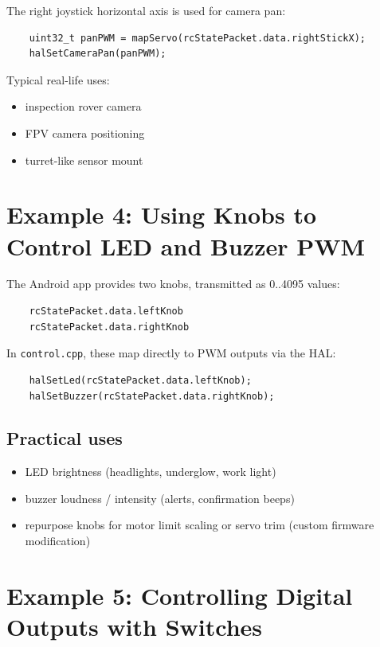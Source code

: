 The right joystick horizontal axis is used for camera pan:

\begin{verbatim}
    uint32_t panPWM = mapServo(rcStatePacket.data.rightStickX);
    halSetCameraPan(panPWM);
\end{verbatim}

\noindent Typical real-life uses:
\begin{itemize}
    \item inspection rover camera
    \item FPV camera positioning
    \item turret-like sensor mount
\end{itemize}

\section{Example 4: Using Knobs to Control LED and Buzzer PWM}
\label{sec:example-knobs}

The Android app provides two knobs, transmitted as 0..4095 values:

\begin{verbatim}
    rcStatePacket.data.leftKnob
    rcStatePacket.data.rightKnob
\end{verbatim}

In \texttt{control.cpp}, these map directly to PWM outputs via the HAL:

\begin{verbatim}
    halSetLed(rcStatePacket.data.leftKnob);
    halSetBuzzer(rcStatePacket.data.rightKnob);
\end{verbatim}

\subsection*{Practical uses}
\begin{itemize}
    \item LED brightness (headlights, underglow, work light)
    \item buzzer loudness / intensity (alerts, confirmation beeps)
    \item repurpose knobs for motor limit scaling or servo trim (custom firmware modification)
\end{itemize}

\section{Example 5: Controlling Digital Outputs with Switches}
\label{sec:example-switches}


